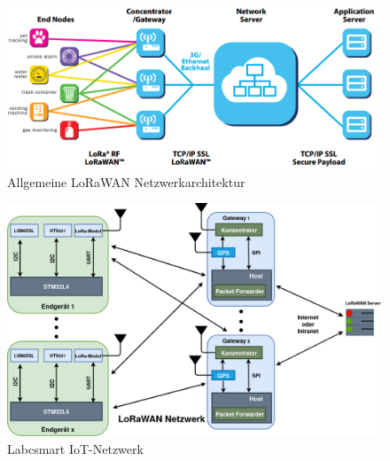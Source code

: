 \vspace{2cm}
\begin{figure}[h]
	\centering
	\includegraphics[width=15cm]{source/images/LoRaWAN_NET}
	\caption{Allgemeine LoRaWAN Netzwerkarchitektur 
	\cite{LoRaWAN}\label{fig:LRWAN}}
\end{figure}


\begin{figure}[h]
	\centering
	\includegraphics[width=15cm]{source/images/Gesamtsystem}
	\caption{Labcsmart IoT-Netzwerk \label{fig:LabcsmartLoRawan}}
\end{figure}


